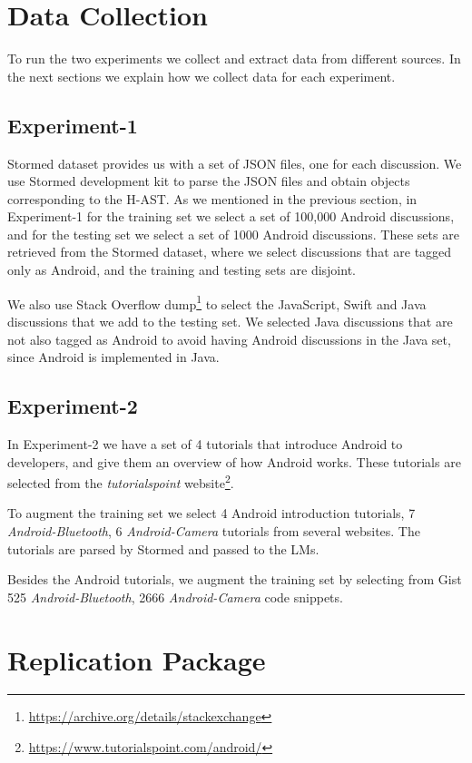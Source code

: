 \documentclass[12pt,mscthesis]{usiinfthesis}
\begin{document}
{	\section{Data Collection}	

	To run the two experiments we collect and extract data from different sources. In the next sections we explain how we collect data for each experiment.

	\subsection{Experiment-1}

	Stormed dataset provides us with a set of JSON files, one for each discussion. We use Stormed development kit to parse the JSON files and obtain objects corresponding to the H-AST.
	As we mentioned in the previous section, in Experiment-1 for the training set we select a set of 100,000 Android discussions, and for the testing set we select a set of 1000 Android discussions. These sets are retrieved from the Stormed dataset, where we select discussions that are tagged only as Android, and the training and testing sets are disjoint.

	We also use Stack Overflow dump\footnote{\url{https://archive.org/details/stackexchange}} to select the JavaScript, Swift and Java discussions that we add to the testing set. We selected Java discussions that are not also tagged as Android to avoid having Android discussions in the Java set, since Android is implemented in Java.

	\subsection{Experiment-2}
	
	In Experiment-2 we have a set of 4 tutorials that introduce Android to developers, and give them an overview of how Android works. These tutorials are  selected from the \emph{tutorialspoint} website\footnote{\url{https://www.tutorialspoint.com/android/}}. 

	To augment the training set we select 4 Android introduction tutorials, 7 \emph{Android-Bluetooth}, 6 \emph{Android-Camera} tutorials from several websites. The tutorials are parsed by Stormed and passed to the LMs.  

	Besides the Android tutorials, we augment the training set by selecting from Gist 525 \emph{Android-Bluetooth}, 2666 \emph{Android-Camera} code snippets.

 	\section{Replication Package}

}
\end{document}
